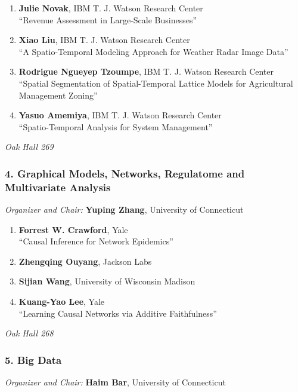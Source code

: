 \begin{enumerate}
\item \textbf{Julie Novak}, IBM T. J. Watson Research Center \\
``Revenue Assessment in Large-Scale Businesses''
\item \textbf{Xiao Liu}, IBM T. J. Watson Research Center \\
``A Spatio-Temporal Modeling Approach for Weather Radar Image Data''
\item \textbf{Rodrigue Ngueyep Tzoumpe}, IBM T. J. Watson Research Center  \\
``Spatial Segmentation of Spatial-Temporal Lattice Models for Agricultural Management Zoning''
\item \textbf{Yasuo Amemiya}, IBM T. J. Watson Research Center \\
``Spatio-Temporal Analysis for System Management''
\end{enumerate}

\emph{Oak Hall 269} \\[.5em]

\subsubsection*{4. Graphical Models, Networks, Regulatome and Multivariate Analysis}

\emph{Organizer and Chair:} \textbf{Yuping Zhang}, University of Connecticut

\begin{enumerate}
\item \textbf{Forrest W. Crawford}, Yale \\
``Causal Inference for Network Epidemics''
\item \textbf{Zhengqing Ouyang}, Jackson Labs 
\item \textbf{Sijian Wang}, University of Wisconsin Madison 
\item \textbf{Kuang-Yao Lee}, Yale \\
``Learning Causal Networks via Additive Faithfulness''
\end{enumerate}

\emph{Oak Hall 268} \\[.5em]

\subsubsection*{5. Big Data}

\emph{Organizer and Chair:} \textbf{Haim Bar}, University of Connecticut

